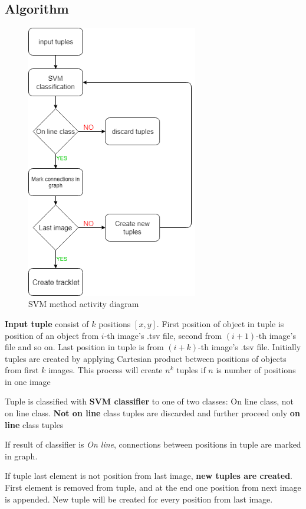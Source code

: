 \subsection{Algorithm}

\begin{figure}[!h]
    \centering
    \includegraphics[height=12cm]{chapters/images/SVM_activity_diagram2.PNG}
    \caption{SVM method activity diagram}
    \label{fig:svm_activity_diagram}
\end{figure}

\textbf{Input tuple} consist of $k$ positions $[x, y]$. First position of object in tuple is position of an object from $i$-th image's .tsv file, second from $(i+1)$-th image's file and so on. Last position in tuple is from $(i+k)$-th image's .tsv file. Initially tuples are created by applying Cartesian product between positions of objects from first $k$ images. This process will create $n^k$ tuples if $n$ is number of positions in one image 

Tuple is classified with \textbf{SVM classifier} to one of two classes:
On line class, not on line class. \textbf{Not on line} class tuples are discarded and further proceed only \textbf{on line} class tuples

If result of classifier is \textit{On line}, connections between positions in tuple are marked in graph. 

If tuple last element is not position from last image, \textbf{new tuples are created}. First element is removed from tuple, and at the end one position from next image is appended. New tuple will be created for every position from last image.

